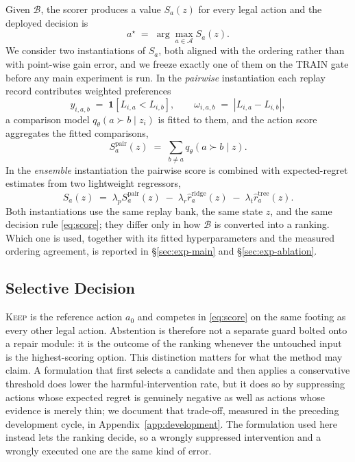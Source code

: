 \documentclass{article}
\newcommand{\calA}{\mathcal{A}}
\newcommand{\calB}{\mathcal{B}}
\begin{document}
Given $\calB$, the scorer produces a value $S_a(z)$ for every legal action and the deployed
decision is
\begin{equation}
  a^{\star} \;=\; \arg\max_{a \in \calA} S_a(z) .
  \label{eq:score}
\end{equation}
We consider two instantiations of $S_a$, both aligned with the ordering rather than with
point-wise gain error, and we freeze exactly one of them on the TRAIN gate before any main
experiment is run. In the \emph{pairwise} instantiation each replay record contributes
weighted preferences
\begin{equation}
  y_{i,a,b} \;=\; \mathbf{1}[L_{i,a} < L_{i,b}],
  \qquad
  \omega_{i,a,b} \;=\; |L_{i,a} - L_{i,b}| ,
  \label{eq:pairwise}
\end{equation}
a comparison model $q_\theta(a \succ b \mid z_i)$ is fitted to them, and the action score
aggregates the fitted comparisons,
\begin{equation}
  S_a^{\mathrm{pair}}(z) \;=\; \sum_{b \neq a} q_\theta(a \succ b \mid z) .
  \label{eq:score-pair}
\end{equation}
In the \emph{ensemble} instantiation the pairwise score is combined with expected-regret
estimates from two lightweight regressors,
\begin{equation}
  S_a(z) \;=\; \lambda_p S_a^{\mathrm{pair}}(z) \;-\; \lambda_r \hat r_a^{\mathrm{ridge}}(z)
  \;-\; \lambda_t \hat r_a^{\mathrm{tree}}(z) .
  \label{eq:score-ensemble}
\end{equation}
Both instantiations use the same replay bank, the same state $z$, and the same decision rule
\eqref{eq:score}; they differ only in how $\calB$ is converted into a ranking. Which one is
used, together with its fitted hyperparameters and the measured ordering agreement, is
reported in \S\ref{sec:exp-main} and \S\ref{sec:exp-ablation}.

\subsection{Selective Decision}
\label{sec:method-decision}
\textsc{Keep} is the reference action $a_0$ and competes in \eqref{eq:score} on the same
footing as every other legal action. Abstention is therefore not a separate guard bolted onto
a repair module: it is the outcome of the ranking whenever the untouched input is the
highest-scoring option. This distinction matters for what the method may claim. A
formulation that first selects a candidate and then applies a conservative threshold does
lower the harmful-intervention rate, but it does so by suppressing actions whose expected
regret is genuinely negative as well as actions whose evidence is merely thin; we document
that trade-off, measured in the preceding development cycle, in
Appendix~\ref{app:development}. The formulation used here instead lets the ranking decide, so
a wrongly suppressed intervention and a wrongly executed one are the same kind of error.
\end{document}
